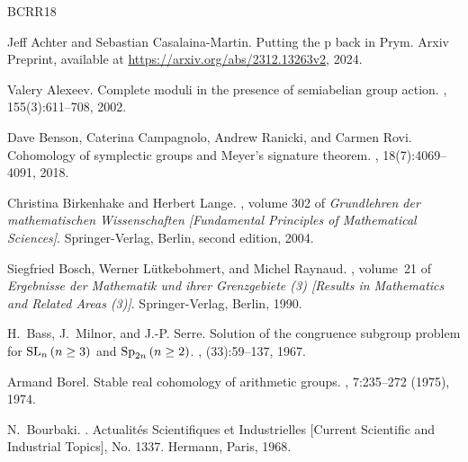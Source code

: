 \begin{thebibliography}{BCRR18}

Jeff Achter and Sebastian Casalaina-Martin.
\newblock Putting the p back in {P}rym.
\newblock Arxiv Preprint, available at
  \url{https://arxiv.org/abs/2312.13263v2}, 2024.

Valery Alexeev.
\newblock Complete moduli in the presence of semiabelian group action.
, 155(3):611--708, 2002.

Dave Benson, Caterina Campagnolo, Andrew Ranicki, and Carmen Rovi.
\newblock Cohomology of symplectic groups and {M}eyer's signature theorem.
, 18(7):4069--4091, 2018.

Christina Birkenhake and Herbert Lange.
, volume 302 of {\em Grundlehren der
  mathematischen Wissenschaften [Fundamental Principles of Mathematical
  Sciences]}.
\newblock Springer-Verlag, Berlin, second edition, 2004.

Siegfried Bosch, Werner L\"{u}tkebohmert, and Michel Raynaud.
, volume~21 of {\em Ergebnisse der Mathematik
  und ihrer Grenzgebiete (3) [Results in Mathematics and Related Areas (3)]}.
\newblock Springer-Verlag, Berlin, 1990.

H.~Bass, J.~Milnor, and J.-P. Serre.
\newblock Solution of the congruence subgroup problem for {${\rm
  SL}_{n}\,(n\geq 3)$} and {${\rm Sp}_{2n}\,(n\geq 2)$}.
, (33):59--137, 1967.

Armand Borel.
\newblock Stable real cohomology of arithmetic groups.
, 7:235--272 (1975), 1974.

N.~Bourbaki.
.
\newblock Actualit\'{e}s Scientifiques et Industrielles [Current Scientific and
  Industrial Topics], No. 1337. Hermann, Paris, 1968.


\end{thebibliography}
